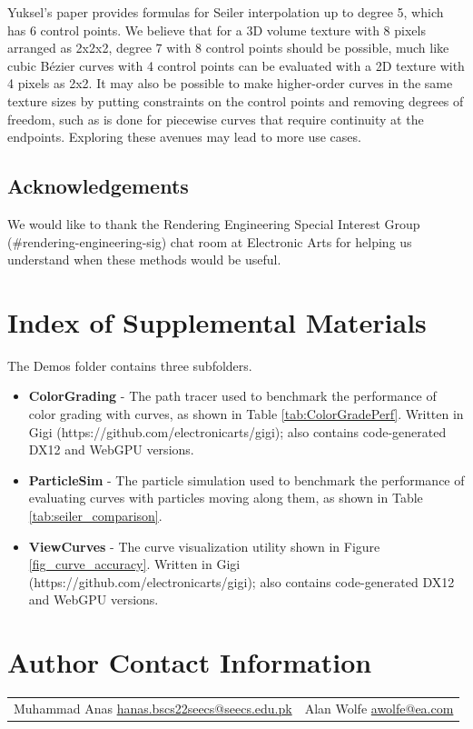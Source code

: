 \documentclass{jcgt}
\begin{document}
Yuksel's paper provides formulas for Seiler interpolation up to degree 5, which has 6 control points. We believe that for a 3D volume texture with 8 pixels arranged as 2x2x2, degree
7 with 8 control points should be possible, much like cubic Bézier curves with 4 control points can be evaluated with a 2D texture with 4 pixels as 2x2. It may also be possible
to make higher-order curves in the same texture sizes by putting constraints on the control points and removing degrees of freedom, such as is done for piecewise curves that require
continuity at the endpoints. Exploring these avenues may lead to more use cases.

\subsection*{Acknowledgements}

We would like to thank the Rendering Engineering Special Interest Group (\#rendering-engineering-sig) chat room at Electronic Arts for helping us understand when these methods
would be useful.

\small



\section*{Index of Supplemental Materials}

The Demos folder contains three subfolders.

\begin{itemize}
    \item \textbf{ColorGrading} - The path tracer used to benchmark the performance of color grading with curves, as shown in Table \ref{tab:ColorGradePerf}. Written in Gigi (https://github.com/electronicarts/gigi); also contains code-generated DX12 and WebGPU versions.
    \item \textbf{ParticleSim} - The particle simulation used to benchmark the performance of evaluating curves with particles moving along them, as shown in Table \ref{tab:seiler_comparison}.
    \item \textbf{ViewCurves} - The curve visualization utility shown in Figure \ref{fig_curve_accuracy}. Written in Gigi (https://github.com/electronicarts/gigi); also contains code-generated DX12 and WebGPU versions.
\end{itemize}

\section*{Author Contact Information}

\hspace{-2mm}\begin{tabular}{p{}p{}}
Muhammad Anas \newline
\href{mailto:hanas.bscs22seecs@seecs.edu.pk}{hanas.bscs22seecs@seecs.edu.pk}
&

Alan Wolfe \newline
\href{mailto:awolfe@ea.com}{awolfe@ea.com}

\end{tabular}


\afterdoc
\end{document}
